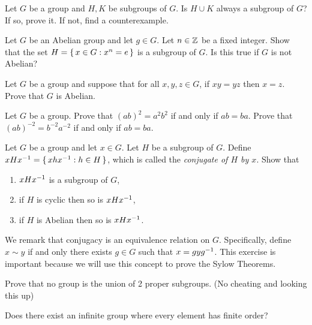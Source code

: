 \documentclass[./main.tex]{subfiles}
\begin{document}
\begin{exercise}
    Let $G$ be a group and $H, K$ be subgroups of $G$. Is $H \cup K$ always a
    subgroup of $G$? If so, prove it. If not, find a counterexample.
\end{exercise}

\begin{exercise}
    Let $G$ be an Abelian group and let $g \in G$. Let $n \in \mathbb{Z}$ be a fixed
    integer. Show that the set $H = \set{x \in G: x^n = e}$ is a subgroup of
    $G$. Is this true if $G$ is not Abelian?
\end{exercise}

\begin{exercise}
    Let $G$ be a group and suppose that for all $x,y,z \in G$, if $xy=yz$ then
    $x=z$. Prove that $G$ is Abelian.
\end{exercise}

\begin{exercise}
    Let $G$ be a group. Prove that $(ab)^2 = a^2 b^2$ if and only if $ab=ba$.
    Prove that $(ab)^{-2} = b^{-2} a^{-2}$ if and only if $ab=ba$.
    \autocite[Ex.~36, Ch~1, \pno~56]{Gallian_2020}
\end{exercise}

\begin{exercise}[Conjugates]
    Let $G$ be a group and let $x \in G$. Let $H$ be a subgroup of $G$. 
    Define $xHx^{-1} = \set{xhx^{-1}: h \in H}$, which is called the \emph{conjugate of $H$ by $x$}.
    Show that 
    \begin{enumerate}
        \item $xHx^{-1}$ is a subgroup of $G$,
        \item if $H$ is cyclic then so is $xHx^{-1}$,
        \item if $H$ is Abelian then so is $xHx^{-1}$.
    \end{enumerate}
    
    We remark that conjugacy is an equivalence relation on $G$. Specifically,
    define $x \sim y$ if and only there exists $g \in G$ such that $x =
    gyg^{-1}$. This exercise is important because we will use this concept to
    prove the Sylow Theorems.
\end{exercise}


\begin{prob}
    Prove that no group is the union of 2 proper subgroups. (No cheating and
    looking this up)
\end{prob}

\begin{prob}
    Does there exist an infinite group where every element has finite order?
\end{prob}
\end{document}
